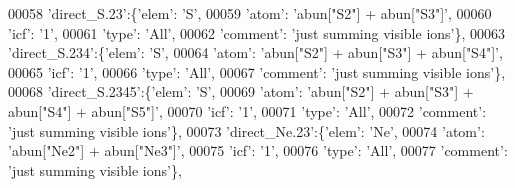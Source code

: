\begin{DoxyCode}
00058                          \textcolor{stringliteral}{'direct\_S.23'}:\{\textcolor{stringliteral}{'elem'}: \textcolor{stringliteral}{'S'},
00059                                        \textcolor{stringliteral}{'atom'}: \textcolor{stringliteral}{'abun["S2"] + abun["S3"]'},
00060                                        \textcolor{stringliteral}{'icf'}: \textcolor{stringliteral}{'1'},
00061                                        \textcolor{stringliteral}{'type'}: \textcolor{stringliteral}{'All'},
00062                                        \textcolor{stringliteral}{'comment'}: \textcolor{stringliteral}{'just summing visible ions'}\},
00063                          \textcolor{stringliteral}{'direct\_S.234'}:\{\textcolor{stringliteral}{'elem'}: \textcolor{stringliteral}{'S'},
00064                                        \textcolor{stringliteral}{'atom'}: \textcolor{stringliteral}{'abun["S2"] + abun["S3"] + abun["S4"]'},
00065                                        \textcolor{stringliteral}{'icf'}: \textcolor{stringliteral}{'1'},
00066                                        \textcolor{stringliteral}{'type'}: \textcolor{stringliteral}{'All'},
00067                                        \textcolor{stringliteral}{'comment'}: \textcolor{stringliteral}{'just summing visible ions'}\},
00068                          \textcolor{stringliteral}{'direct\_S.2345'}:\{\textcolor{stringliteral}{'elem'}: \textcolor{stringliteral}{'S'},
00069                                        \textcolor{stringliteral}{'atom'}: \textcolor{stringliteral}{'abun["S2"] + abun["S3"] + abun["S4"] + abun["S5"]'},
00070                                        \textcolor{stringliteral}{'icf'}: \textcolor{stringliteral}{'1'},
00071                                        \textcolor{stringliteral}{'type'}: \textcolor{stringliteral}{'All'},
00072                                        \textcolor{stringliteral}{'comment'}: \textcolor{stringliteral}{'just summing visible ions'}\},
00073                          \textcolor{stringliteral}{'direct\_Ne.23'}:\{\textcolor{stringliteral}{'elem'}: \textcolor{stringliteral}{'Ne'},
00074                                        \textcolor{stringliteral}{'atom'}: \textcolor{stringliteral}{'abun["Ne2"] + abun["Ne3"]'},
00075                                        \textcolor{stringliteral}{'icf'}: \textcolor{stringliteral}{'1'},
00076                                        \textcolor{stringliteral}{'type'}: \textcolor{stringliteral}{'All'},
00077                                        \textcolor{stringliteral}{'comment'}: \textcolor{stringliteral}{'just summing visible ions'}\},

\end{DoxyCode}
